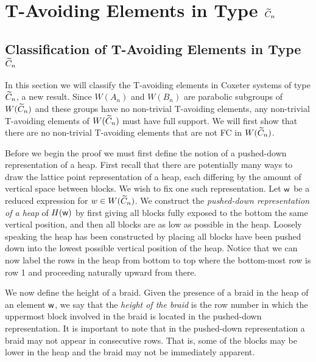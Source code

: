 \chapter{T-Avoiding Elements in Type $\widetilde{C}_n$}\label{chap:Cn}



\section{Classification of T-Avoiding Elements in Type $\widetilde{C}_n$}\label{sec:TAC}

In this section we will classify the T-avoiding elements in Coxeter systems of type $\widetilde{C}_n$, a new result. Since $W(A_n)$ and $W(B_n)$ are parabolic subgroups of $W(\widetilde{C}_n)$ and these groups have no non-trivial T-avoiding elements,  any non-trivial T-avoiding elements of $W(\widetilde{C}_n)$ must have full support. We will first show that there are no non-trivial T-avoiding elements that are not FC in $W(\widetilde{C}_n)$.

Before we begin the proof we must first define the notion of a pushed-down representation of a heap. First recall that there are potentially many ways to draw the lattice point representation of a heap, each differing by the amount of vertical space between blocks. We wish to fix one such representation. Let $\mathsf{w}$ be a reduced expression for $w \in W(\widetilde{C}_n)$. We construct the \emph{pushed-down representation of a heap} of $H(\mathsf{w})$ by first giving all blocks fully exposed to the bottom the same vertical position, and then all blocks are as low as possible in the heap. Loosely speaking the heap has been constructed by placing all blocks have been pushed down into the lowest possible vertical position of the heap. Notice that we can now label the rows in the heap from bottom to top where the bottom-most row is row 1 and proceeding naturally upward from there. 

We now define the height of a braid. Given the presence of a braid in the heap of an element $\mathsf{w}$, we say that the \emph{height of the braid} is the row number in which the uppermost block involved in the braid is located in the pushed-down representation. It is important to note that in the pushed-down representation a braid may not appear in consecutive rows. That is, some of the blocks may be lower in the heap and the braid may not be immediately apparent. 

